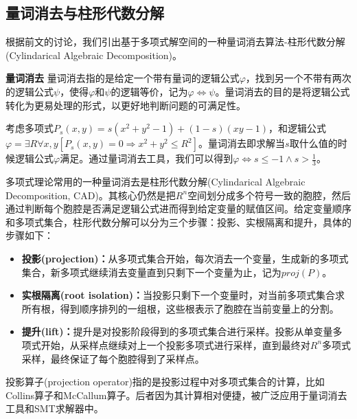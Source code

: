 \subsection{量词消去与柱形代数分解}
根据前文的讨论，我们引出基于多项式解空间的一种量词消去算法-柱形代数分解(Cylindarical Algebraic Decomposition)。

\begin{definition}{\textbf{量词消去}}
量词消去指的是给定一个带有量词的逻辑公式$\varphi$，找到另一个不带有两次的逻辑公式$\psi$，使得$\varphi$和$\psi$的逻辑等价，记为$\varphi \Leftrightarrow \psi$。量词消去的目的是将逻辑公式转化为更易处理的形式，以更好地判断问题的可满足性。
\end{definition}

\begin{example}
考虑多项式$P_s(x, y) = s(x^2 + y^2 - 1) + (1 - s)(xy - 1)$，和逻辑公式$\varphi = \exists R \forall x, y [P_s(x, y) = 0 \Rightarrow x^2 + y^2 \leq R^2]$。量词消去即求解当$s$取什么值的时候逻辑公式$\varphi$满足。通过量词消去工具，我们可以得到$\varphi \Leftrightarrow s \le -1 \wedge s > \frac{1}{3}$。\label{ex:quantifier_elimination}
\end{example}

多项式理论常用的一种量词消去是柱形代数分解(Cylindarical Algebraic Decomposition, CAD)。其核心仍然是把$R^n$空间划分成多个符号一致的胞腔，然后通过判断每个胞腔是否满足逻辑公式进而得到给定变量的赋值区间。给定变量顺序和多项式集合，柱形代数分解可以分为三个步骤：投影、实根隔离和提升，具体的步骤如下：
\begin{itemize}
    \item \textbf{投影(projection)：}从多项式集合开始，每次消去一个变量，生成新的多项式集合，新多项式继续消去变量直到只剩下一个变量为止，记为$proj(P)$。
    \item \textbf{实根隔离(root isolation)：}当投影只剩下一个变量时，对当前多项式集合求所有根，得到顺序排列的一组根，这些根表示了胞腔在当前变量上的分割。
    \item \textbf{提升(lift)：}提升是对投影阶段得到的多项式集合进行采样。投影从单变量多项式开始，从采样点继续对上一个投影多项式进行采样，直到最终对$R^n$多项式采样，最终保证了每个胞腔得到了采样点。
\end{itemize}

投影算子(projection operator)指的是投影过程中对多项式集合的计算，比如Collins算子\cite{Collins74}和McCallum算子\cite{McCallum98}。后者因为其计算相对便捷，被广泛应用于量词消去工具和SMT求解器中。

